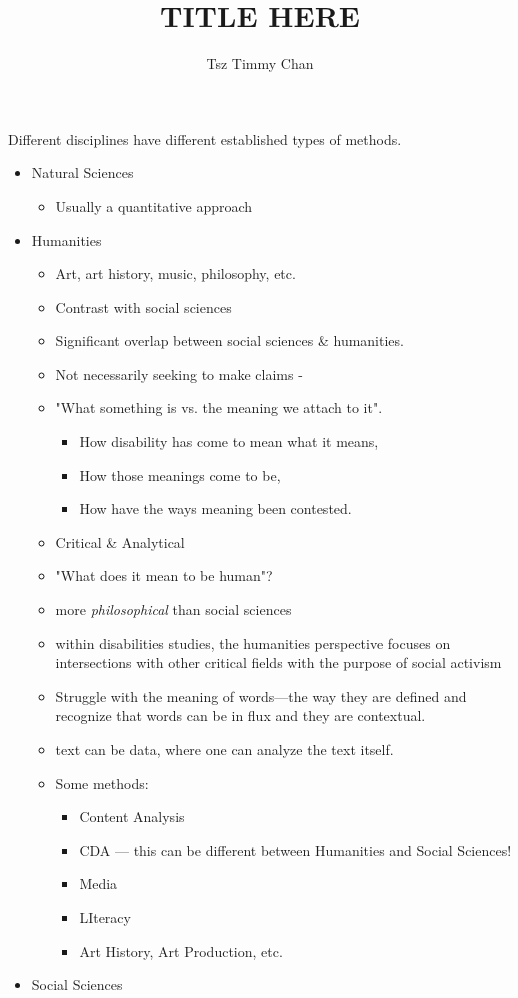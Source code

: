 \documentclass{TC}
\title{TITLE HERE}	%
\author{Tsz Timmy Chan}	%
\begin{document}
Different disciplines have different established types of methods.

\begin{itemize}
\item Natural Sciences 
	\begin{itemize}
	\item Usually a quantitative approach
	\end{itemize}
\item Humanities
	\begin{itemize}
	\item Art, art history, music, philosophy, etc.
	\item Contrast with social sciences
	\item Significant overlap between social sciences \& humanities. 
	\item Not necessarily seeking to make claims -
	\item "What something is vs. the meaning we attach to it".	
		\begin{itemize}
		\item How disability has come to mean what it means,
		\item How those meanings come to be,
		\item How have the ways meaning been contested.
		\end{itemize}
	\item Critical \& Analytical
	\item "What does it mean to be human"?
	\item more \emph{philosophical} than social sciences
	\item within disabilities studies, the humanities perspective focuses on intersections with other critical fields with the purpose of social activism
	\item Struggle with the meaning of words---the way they are defined and recognize that words can be in flux and they are contextual.
	\item text can be data, where one can analyze the text itself.
	\item Some methods:
		\begin{itemize}
		\item Content Analysis
		\item \gls{CDA} --- this can be different between Humanities and Social Sciences! 
		\item Media
		\item LIteracy
		\item Art History, Art Production, etc.
		\end{itemize}
	\end{itemize}
\item Social Sciences
\end{itemize}
\end{document}
